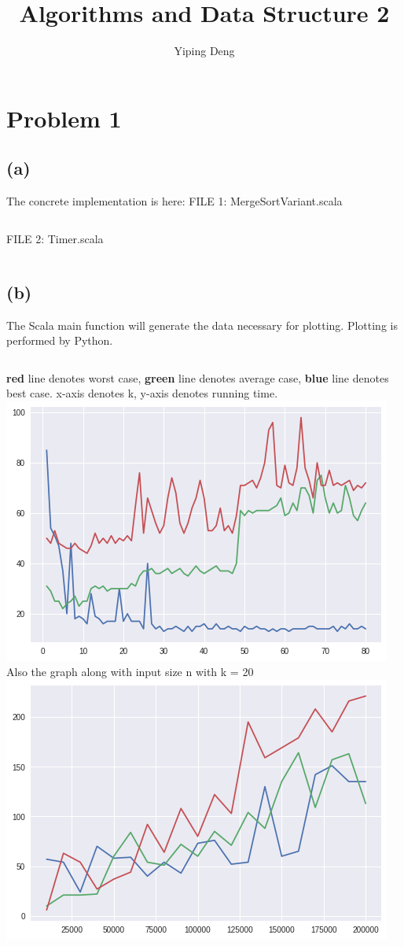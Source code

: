\documentclass{article}
\newcommand{\hwnumber}{2}
\begin{document}
\title{Algorithms and Data Structure \hwnumber}
\author{Yiping Deng}
\maketitle
\thispagestyle{fancy}
\section*{Problem 1}
\subsection*{(a)}
The concrete implementation is here:
FILE 1: MergeSortVariant.scala
\inputminted{Scala}{MergeSortVariant/src/main/scala/MergeSortVariant.scala}
FILE 2: Timer.scala
\inputminted{Scala}{MergeSortVariant/src/main/scala/Timer.scala}
\subsection*{(b)}
The Scala main function will generate the data necessary for plotting.
Plotting is performed by Python.
\inputminted{Python}{plot.py}
\textbf{red} line denotes worst case, \textbf{green} line denotes average case, \textbf{blue} line denotes best case.
x-axis denotes k, y-axis denotes running time. \\
\includegraphics{plot.png}
Also the graph along with input size n with k = 20 \\
\includegraphics{k20.png}
\end{document}
